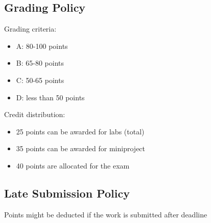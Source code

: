 \subsection{Grading Policy}

Grading criteria:
\begin{itemize}
    \item A: 80-100 points
    \item B: 65-80 points
    \item C: 50-65 points
    \item D: less than 50 points
\end{itemize}

Credit distribution:
\begin{itemize}
    \item 25 points can be awarded for labs (total)
    \item 35 points can be awarded for miniproject
    \item 40 points are allocated for the exam
\end{itemize}

\subsection{Late Submission Policy}
Points might be deducted if the work is submitted after deadline
